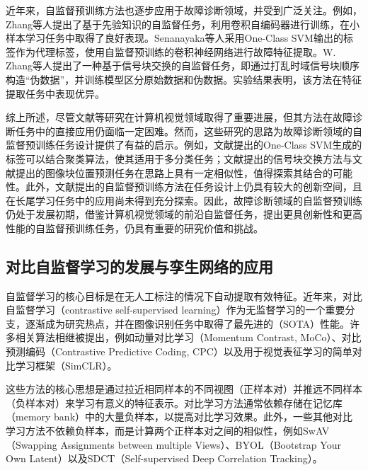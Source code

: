 \documentclass[master]{thesis-uestc}
\begin{document}
近年来，自监督预训练方法也逐步应用于故障诊断领域，并受到广泛关注。例如，Zhang等人提出了基于先验知识的自监督任务，利用卷积自编码器进行训练，在小样本学习任务中取得了良好表现。Senanayaka等人采用One-Class SVM输出的标签作为代理标签，使用自监督预训练的卷积神经网络进行故障特征提取。W. Zhang等人提出了一种基于信号块交换的自监督任务，即通过打乱时域信号块顺序构造“伪数据”，并训练模型区分原始数据和伪数据。实验结果表明，该方法在特征提取任务中表现优异。

综上所述，尽管文献\cite{doersch2015unsupervised, zhang2016colorful, gidaris2018unsupervised}等研究在计算机视觉领域取得了重要进展，但其方法在故障诊断任务中的直接应用仍面临一定困难。然而，这些研究的思路为故障诊断领域的自监督预训练任务设计提供了有益的启示。例如，文献\cite{senanayaka2020toward}提出的One-Class SVM生成的标签可以结合聚类算法，使其适用于多分类任务；文献\cite{zhang2021federated}提出的信号块交换方法与文献\cite{doersch2015unsupervised}提出的图像块位置预测任务在思路上具有一定相似性，值得探索其结合的可能性。此外，文献\cite{zhang2022prior, senanayaka2020toward, zhang2021federated}提出的自监督预训练方法在任务设计上仍具有较大的创新空间，且在长尾学习任务中的应用尚未得到充分探索。因此，故障诊断领域的自监督预训练仍处于发展初期，借鉴计算机视觉领域的前沿自监督任务，提出更具创新性和更高性能的自监督预训练任务，仍具有重要的研究价值和挑战。

\subsection{对比自监督学习的发展与孪生网络的应用}

自监督学习的核心目标是在无人工标注的情况下自动提取有效特征。近年来，对比自监督学习（contrastive self-supervised learning）作为无监督学习的一个重要分支，逐渐成为研究热点，并在图像识别任务中取得了最先进的（SOTA）性能。许多相关算法相继被提出，例如动量对比学习（Momentum Contrast, MoCo）、对比预测编码（Contrastive Predictive Coding, CPC）以及用于视觉表征学习的简单对比学习框架（SimCLR）。

这些方法的核心思想是通过拉近相同样本的不同视图（正样本对）并推远不同样本（负样本对）来学习有意义的特征表示。对比学习方法通常依赖存储在记忆库（memory bank）中的大量负样本，以提高对比学习效果。此外，一些其他对比学习方法不依赖负样本，而是计算两个正样本对之间的相似性，例如SwAV（Swapping Assignments between multiple Views）、BYOL（Bootstrap Your Own Latent）以及SDCT（Self-supervised Deep Correlation Tracking）。
\end{document}
